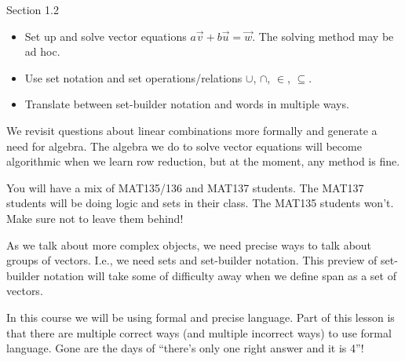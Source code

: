 \documentclass{problemset}
\begin{document}
\begin{lesson}

	Section 1.2

	\begin{itemize}
		\item Set up and solve vector equations $a\vec v+b\vec u=\vec w$. The solving
			method may be ad hoc.
		\item Use set notation and set operations/relations $\cup$, $\cap$, $\in$, $\subseteq$.
		\item Translate between set-builder notation and words in multiple ways.
	\end{itemize}

	We revisit questions about linear combinations more formally and generate a need for
	algebra. The algebra we do to solve vector equations will become algorithmic when
	we learn row reduction, but at the moment, any method is fine.

	\begin{annotation}
		\begin{notes}
			You will have a mix of MAT135/136 and MAT137 students.
			The MAT137 students will be doing logic and sets in their
			class. The MAT135 students won't. Make sure not to leave them
			behind!
		\end{notes}
	\end{annotation}
	As we talk about more complex objects, we need precise ways to talk about
	groups of vectors. I.e., we need sets and set-builder notation. This preview of set-builder
	notation will take some of difficulty away when we define span as a set of vectors.

	In this course we will be using formal and precise language. Part of this lesson
	is that there are multiple correct ways (and multiple incorrect ways) to use formal
	language. Gone are the days of ``there's only one right answer and it is 4''!

\end{lesson}
\end{document}
